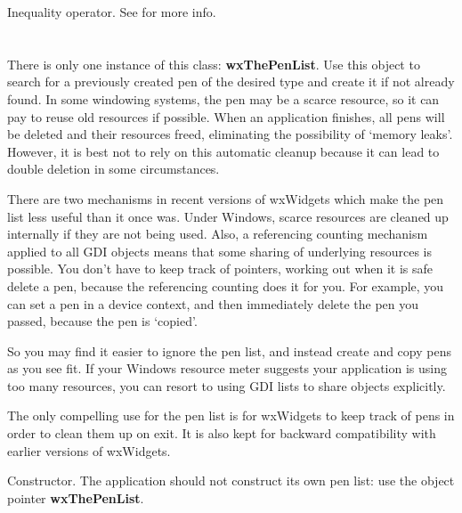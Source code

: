 
Inequality operator.
See  for more info.

\section{}\label{wxpenlist}

There is only one instance of this class: {\bf wxThePenList}.  Use
this object to search for a previously created pen of the desired
type and create it if not already found. In some windowing systems,
the pen may be a scarce resource, so it can pay to reuse old
resources if possible. When an application finishes, all pens will
be deleted and their resources freed, eliminating the possibility of
`memory leaks'. However, it is best not to rely on this automatic
cleanup because it can lead to double deletion in some circumstances.

There are two mechanisms in recent versions of wxWidgets which make the
pen list less useful than it once was. Under Windows, scarce resources
are cleaned up internally if they are not being used. Also, a referencing
counting mechanism applied to all GDI objects means that some sharing
of underlying resources is possible. You don't have to keep track of pointers,
working out when it is safe delete a pen, because the referencing counting does
it for you. For example, you can set a pen in a device context, and then
immediately delete the pen you passed, because the pen is `copied'.

So you may find it easier to ignore the pen list, and instead create
and copy pens as you see fit. If your Windows resource meter suggests
your application is using too many resources, you can resort to using
GDI lists to share objects explicitly.

The only compelling use for the pen list is for wxWidgets to keep
track of pens in order to clean them up on exit. It is also kept for
backward compatibility with earlier versions of wxWidgets.




\label{wxpenlistctor}


Constructor. The application should not construct its own pen list:
use the object pointer {\bf wxThePenList}.

